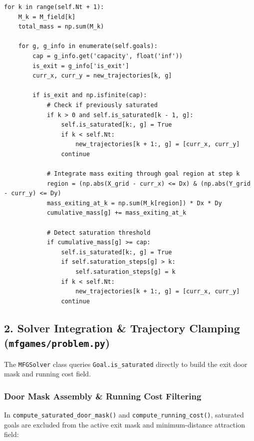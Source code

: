 \documentclass[11pt,a4paper]{article}
\begin{document}
\begin{verbatim}
for k in range(self.Nt + 1):
    M_k = M_field[k]
    total_mass = np.sum(M_k)

    for g, g_info in enumerate(self.goals):
        cap = g_info.get('capacity', float('inf'))
        is_exit = g_info['is_exit']
        curr_x, curr_y = new_trajectories[k, g]

        if is_exit and np.isfinite(cap):
            # Check if previously saturated
            if k > 0 and self.is_saturated[k - 1, g]:
                self.is_saturated[k:, g] = True
                if k < self.Nt:
                    new_trajectories[k + 1:, g] = [curr_x, curr_y]
                continue

            # Integrate mass exiting through goal region at step k
            region = (np.abs(X_grid - curr_x) <= Dx) & (np.abs(Y_grid - curr_y) <= Dy)
            mass_exiting_at_k = np.sum(M_k[region]) * Dx * Dy
            cumulative_mass[g] += mass_exiting_at_k

            # Detect saturation threshold
            if cumulative_mass[g] >= cap:
                self.is_saturated[k:, g] = True
                if self.saturation_steps[g] > k:
                    self.saturation_steps[g] = k
                if k < self.Nt:
                    new_trajectories[k + 1:, g] = [curr_x, curr_y]
                continue
\end{verbatim}

\subsection{2. Solver Integration \& Trajectory Clamping (\texttt{mfgames/problem.py})}
The \texttt{MFGSolver} class queries \texttt{Goal.is_saturated} directly to build the exit door mask and running cost field.

\subsubsection{Door Mask Assembly \& Running Cost Filtering}
In \texttt{compute_saturated_door_mask()} and \texttt{compute_running_cost()}, saturated goals are excluded from the active exit mask and minimum-distance attraction field:
\end{document}
